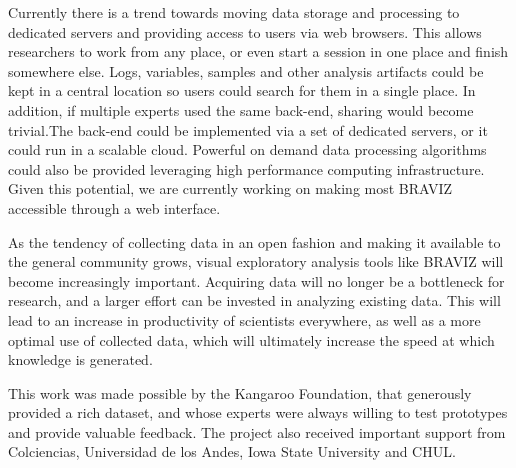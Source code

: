 \documentclass[twocolumn]{svjour3}
\begin{document}
Currently there is a trend towards moving data storage and processing to dedicated servers and providing access to users via web browsers. This allows researchers to work from any place, or even start a session in one place and finish somewhere else. Logs, variables, samples and other analysis artifacts could be kept in a central location so users could search for them in a single place. In addition, if multiple experts used the same back-end, sharing would become trivial.The back-end could be implemented via a set of dedicated servers, or it could run in a scalable cloud. Powerful on demand data processing algorithms could also be provided leveraging high performance computing infrastructure. Given this potential, we are currently working on making most BRAVIZ accessible through a web interface. 

As the tendency of collecting data in an open fashion and making it available to the general community grows, visual exploratory analysis tools like BRAVIZ  will become increasingly important. Acquiring data will no longer be a bottleneck for research, and a larger effort can be invested in analyzing existing data. This will lead to an increase in productivity of scientists everywhere, as well as a more optimal use of collected data, which will ultimately increase the speed at which knowledge is generated.

\begin{acknowledgements}

This work was made possible by the Kangaroo Foundation, that generously provided a rich dataset, and whose experts were always willing to test prototypes and provide valuable feedback. The project also received important support from Colciencias, Universidad de los Andes, Iowa State University and CHUL.

\end{acknowledgements}

 

\end{document}
